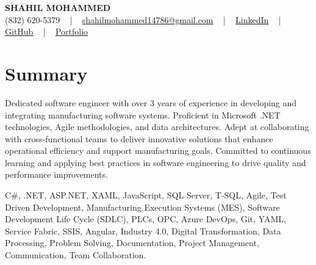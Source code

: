 \documentclass[letterpaper,10pt]{article}
\begin{document}
\begin{center}
    {\fontsize{14pt}{12pt}\selectfont \textbf{\MakeUppercase{Shahil Mohammed}}}\\ \vspace{2pt}
    \fontsize{10pt}{12pt}\selectfont (832) 620-5379 ~ | ~ \href{mailto:shahilmohammed14786@gmail.com}{shahilmohammed14786@gmail.com} ~ | ~  
    \href{https://www.linkedin.com/in/shahil-mohammed-9652931a1/}{\color{blue}\underline{LinkedIn}}  ~ | ~ 
    \href{https://github.com/freakbeast14}{\color{blue}\underline{GitHub}} ~ | ~ 
    \href{https://shahil-mohammed.netlify.app/}{\color{blue}\underline{Portfolio}}
    \vspace{-8pt}
\end{center}

\section{Summary}
\vspace{-2pt}\fontsize{8pt}{9pt}\selectfont
Dedicated software engineer with over 3 years of experience in developing and integrating manufacturing software systems. Proficient in Microsoft .NET technologies, Agile methodologies, and data architectures. Adept at collaborating with cross-functional teams to deliver innovative solutions that enhance operational efficiency and support manufacturing goals. Committed to continuous learning and applying best practices in software engineering to drive quality and performance improvements.
 \vspace{-5pt}
 
{\fontsize{1pt}{1pt}\selectfont\color{white}
C#, .NET, ASP.NET, XAML, JavaScript, SQL Server, T-SQL, Agile, Test Driven Development, Manufacturing Execution Systems (MES), Software Development Life Cycle (SDLC), PLCs, OPC, Azure DevOps, Git, YAML, Service Fabric, SSIS, Angular, Industry 4.0, Digital Transformation, Data Processing, Problem Solving, Documentation, Project Management, Communication, Team Collaboration.
}
\vspace{-8pt}

\vspace{-2pt}
\end{document}
